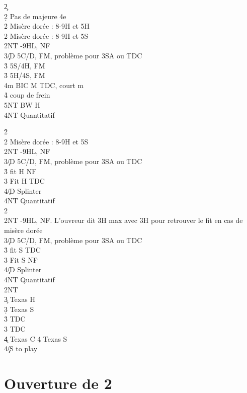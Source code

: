 \documentclass[a4paper]{article}
\begin{document}
\begin{bidtable}
2\c\+\\
2\d \> Pas de majeure 4e\+\\
2\h \> Misère dorée : 8-9H et 5H\\
2\s \> Misère dorée : 8-9H et 5S\\
2NT -9HL, NF\\
3\c/D \> 5C/D, FM, problème pour 3SA ou TDC\\
3\h \> 5S/4H, FM\\
3\h \> 5H/4S, FM\\
4m \> BIC M TDC, court m\+\\
4\h \> coup de frein\\
5NT \> BW H\-\\
4NT \> Quantitatif\-\-
\end{bidtable}

\begin{bidtable}
2\h\+\\
2\s \> Misère dorée : 8-9H et 5S\\
2NT -9HL, NF\\
3\c/D \> 5C/D, FM, problème pour 3SA ou TDC\\
3\h \> fit H NF\\
3\s \> Fit H TDC\\
4\c/D \> Splinter\\
4NT \> Quantitatif\-\\
2\s\+\\
2NT -9HL, NF. L'ouvreur dit 3H max avec 3H pour retrouver le fit en cas de misère dorée\\
3\c/D \> 5C/D, FM, problème pour 3SA ou TDC\\
3\h \> fit S TDC\\
3\s \> Fit S NF\\
4\c/D \> Splinter\\
4NT \> Quantitatif\-\\
2NT\+\\
3\c \> Texas H\\
3\d \> Texas S\\
3\h \> TDC\\
3\s \> TDC\\
4\c \> Texas C %
4\d \> Texas S\\
4\c/S \> to play\-
\end{bidtable}

\section{Ouverture de 2\pdfc}
\end{document}
